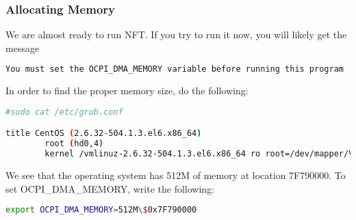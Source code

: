 \subsubsection{Allocating Memory}
We are almost ready to run NFT.  If you try to run it now, you will likely get the message
\begin{lstlisting}[language=bash]
You must set the OCPI_DMA_MEMORY variable before running this program
\end{lstlisting}

In order to find the proper memory size, do the following:
\begin{lstlisting}[language=bash]
#sudo cat /etc/grub.conf

title CentOS (2.6.32-504.1.3.el6.x86_64)
        root (hd0,4)
        kernel /vmlinuz-2.6.32-504.1.3.el6.x86_64 ro root=/dev/mapper/VolGroup-lv_root rd_NO_LUKS LANG=en_US.UTF-8 rd_NO_MD rd_LVM_LV=VolGroup/lv_swap memmap=512M$0x7F790000  SYSFONT=latarcyrheb-sun16 crashkernel=128M rd_LVM_LV=VolGroup/
\end{lstlisting}

We see that the operating system has 512M of memory at location 7F790000.  To set OCPI\_DMA\_MEMORY, write the following:

\begin{lstlisting}[language=bash]
export OCPI_DMA_MEMORY=512M\$0x7F790000
\end{lstlisting}

